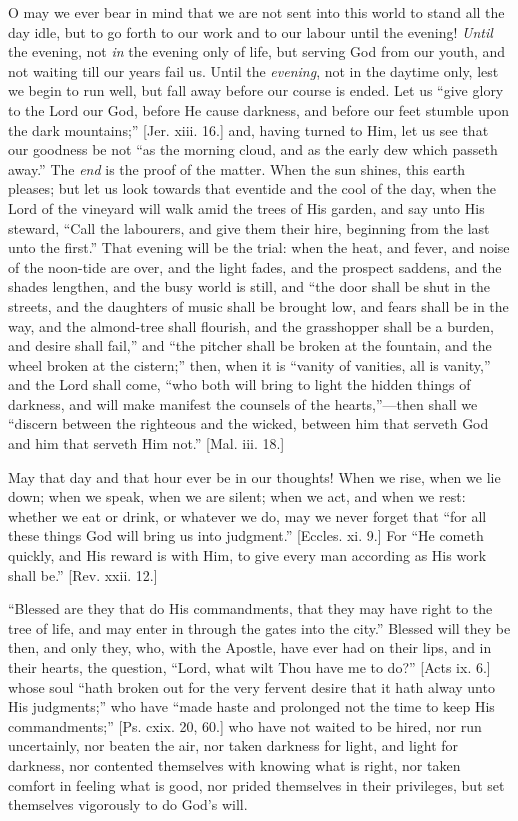 O may we ever bear in mind that we are not sent into this world to
stand all the day idle, but to go forth to our work and to our labour
until the evening! \emph{Until} the evening, not \emph{in} the evening
only of life, but serving God from our youth, and not waiting till our
years fail us. Until the \emph{evening}, not in the daytime only, lest
we begin to run well, but fall away before our course is ended. Let us
``give glory to the Lord our God, before He cause darkness, and
before our feet stumble upon the dark mountains;'' [Jer. xiii.
16.] and, having turned to Him, let us see that our goodness be not
``as the morning cloud, and as the early dew which passeth
away.'' The \emph{end} is the proof of the matter. When the sun
shines, this earth pleases; but let us look towards that eventide and
the cool of the day, when the Lord of the vineyard will walk amid the
trees of His garden, and say unto His steward, ``Call the
labourers, and give them their hire, beginning from the last unto the
first.'' That evening will be the trial: when the heat, and fever,
and noise of the noon-tide are over, and the light fades, and the
prospect saddens, and the shades lengthen, and the busy world is
still, and ``the door shall be shut in the streets, and the
daughters of music shall be brought low, and fears shall be in the
way, and the almond-tree shall flourish, and the grasshopper shall be
a burden, and desire shall fail,'' and ``the pitcher shall be
broken at the fountain, and the wheel broken at the cistern;''
then, when it is ``vanity of vanities, all is vanity,'' and
the Lord shall come, ``who both will bring to light the hidden
things of darkness, and will make manifest the counsels of the hearts,''—then shall we ``discern between the righteous and
the wicked, between him that serveth God and him that serveth Him
not.'' [Mal. iii. 18.]

May that day and that hour ever be in our thoughts! When we rise,
when we lie down; when we speak, when we are silent; when we act, and
when we rest: whether we eat or drink, or whatever we do, may we never
forget that ``for all these things God will bring us into
judgment.'' [Eccles. xi. 9.] For ``He cometh quickly, and His
reward is with Him, to give every man according as His work shall
be.'' [Rev. xxii. 12.]

``Blessed are they that do His commandments, that they may have
right to the tree of life, and may enter in through the gates into the
city.'' Blessed will they be then, and only they, who, with the
Apostle, have ever had on their lips, and in their hearts, the
question, ``Lord, what wilt Thou have me to do?'' [Acts ix.
6.] whose soul ``hath broken out for the very fervent desire that
it hath alway unto His judgments;'' who have ``made haste and
prolonged not the time to keep His commandments;'' [Ps. cxix. 20,
60.] who have not waited to be hired, nor run uncertainly, nor beaten
the air, nor taken darkness for light, and light for darkness, nor
contented themselves with knowing what is right, nor taken comfort in
feeling what is good, nor prided themselves in their privileges, but
set themselves vigorously to do God's will.

